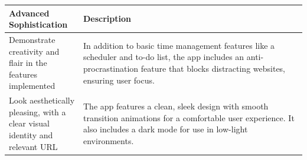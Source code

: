 \documentclass[a4paper]{article}
\begin{document}
{\noindent\begin{tabular}{|p{0.25\linewidth}|p{0.75\linewidth}|}
	\hline
	\textbf{Advanced Sophistication} & \textbf{Description} \\
\hline
Demonstrate creativity and flair in the features implemented & In addition to basic time management features like a scheduler and to-do list, the app includes an anti-procrastination feature that blocks distracting websites, ensuring user focus. \\
\hline
Look aesthetically pleasing, with a clear visual identity and relevant URL & The app features a clean, sleek design with smooth transition animations for a comfortable user experience. It also includes a dark mode for use in low-light environments. \\
\hline
\end{tabular}}
\end{document}
